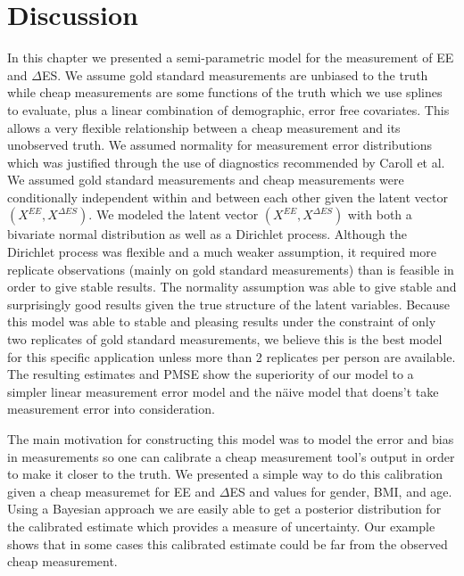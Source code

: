 \documentclass[11pt]{article}\usepackage[]{graphicx}\usepackage[]{color}
\begin{document}
  
  
\section{Discussion}

In this chapter we presented a semi-parametric model for the measurement of EE and $\Delta$ES. We assume gold standard measurements are unbiased to the truth while cheap measurements are some functions of the truth which we use splines to evaluate, plus a linear combination of demographic, error free covariates. This allows a very flexible relationship between a cheap measurement and its unobserved truth. We assumed normality for measurement error distributions which was justified through the use of diagnostics recommended by Caroll et al. We assumed gold standard measurements and cheap measurements were conditionally independent within and between each other given the latent vector $(X^{EE},X^{\Delta ES})$. We modeled the latent vector $(X^{EE},X^{\Delta ES})$ with both a bivariate normal distribution as well as a Dirichlet process. Although the Dirichlet process was flexible and a much weaker assumption, it required more replicate observations (mainly on gold standard measurements) than is feasible in order to give stable results. The normality assumption was able to give stable and surprisingly good results given the true structure of the latent variables. Because this model was able to stable and pleasing results under the constraint of only two replicates of gold standard measurements, we believe this is the best model for this specific application unless more than 2 replicates per person are available. The resulting estimates and PMSE show the superiority of our model to a simpler linear measurement error model and the n{\"a}ive model that doens't take measurement error into consideration. 

The main motivation for constructing this model was to model the error and bias in measurements so one can calibrate a cheap measurement tool's output in order to make it closer to the truth. We presented a simple way to do this calibration given a cheap measuremet for EE and $\Delta$ES and values for gender, BMI, and age. Using a Bayesian approach we are easily able to get a posterior distribution for the calibrated estimate which provides a measure of uncertainty. Our example shows that in some cases this calibrated estimate could be far from the observed cheap measurement. 
\end{document}
